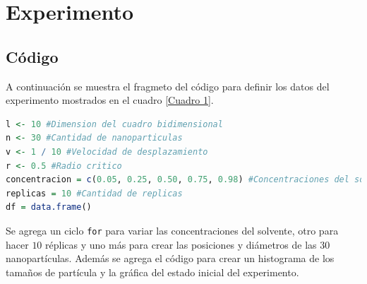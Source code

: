 \documentclass[3p,times,twocolumn]{elsarticle}
\begin{document}
\section{Experimento}

\subsection{Código}
A continuación se muestra el fragmeto del código para definir los datos del experimento mostrados en el cuadro \ref{Cuadro 1}.



\lstset{style=mystyle}
\begin{lstlisting}[language=R, caption= Fragmento del código para definir datos.]
l <- 10 #Dimension del cuadro bidimensional
n <- 30 #Cantidad de nanoparticulas
v <- 1 / 10 #Velocidad de desplazamiento
r <- 0.5 #Radio critico
concentracion = c(0.05, 0.25, 0.50, 0.75, 0.98) #Concentraciones del solvente
replicas = 10 #Cantidad de replicas
df = data.frame() 
\end{lstlisting}

Se agrega un ciclo \texttt{for} para variar las concentraciones del solvente, otro para hacer $10$ réplicas y uno más para crear las posiciones y diámetros de las $30$ nanopartículas. Además se agrega el código para crear un histograma de los tamaños de partícula y la gráfica del estado inicial del experimento.
\end{document}
